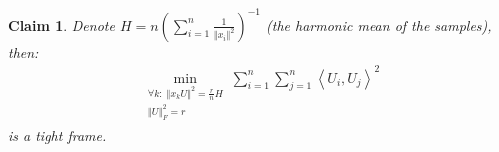 \documentclass{article}
\newtheorem{corollary}{Corollary}
\newtheorem{claim}{Claim}
\begin{document}



\begin{claim}
Denote $H=n\left(\sum_{i=1}^{n}\frac{1}{\left\Vert x_{i}\right\Vert ^{2}}\right)^{-1}$ (the harmonic mean of the samples), then:
\begin{align}
    \min_{\begin{array}{c}
    \forall k:\;\left\Vert x_{k}U\right\Vert ^{2}=\frac{r}{n}H\\
    \left\Vert U\right\Vert _{F}^{2}=r
    \end{array}}\sum_{i=1}^{n}\sum_{j=1}^{n}\left\langle U_{i},U_{j}\right\rangle ^{2}
\end{align}
is a tight frame.
\end{claim}
\end{document}

